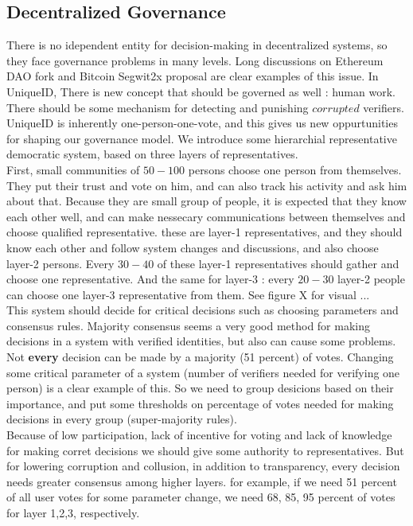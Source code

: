 \documentclass{article}
\begin{document}
\subsection{Decentralized Governance}
There is no idependent entity for decision-making in decentralized systems, so they face governance problems in many levels. Long discussions on Ethereum DAO fork and Bitcoin Segwit2x proposal are clear examples of this issue. In UniqueID, There is new concept that should be governed as well : human work. There should be some mechanism for detecting and punishing $corrupted$ verifiers.
\\
UniqueID is inherently one-person-one-vote, and this gives us new oppurtunities for shaping our governance model. We introduce some hierarchial representative democratic system, based on three layers of representatives. 
\\
First, small communities of $50-100$ persons choose one person from themselves. They put their trust and vote on him, and can also track his activity and ask him about that. Because they are small group of people, it is expected that they know each other well, and can make nessecary communications between themselves and choose qualified representative. these are layer-1 representatives, and they should know each other and follow system changes and discussions, and also choose layer-2 persons. Every $30-40$ of these layer-1 representatives should gather and choose one representative. And the same for layer-3 : every $20-30$ layer-2 people can choose one layer-3 representative from them. See figure X for visual ...
\\
This system should decide for critical decisions such as choosing parameters and consensus rules. Majority consensus seems a very good method for making decisions in a system with verified identities, but also can cause some problems. Not \textbf{every} decision can be made by a majority (51 percent) of votes. Changing some critical parameter of a system (number of verifiers needed for verifying one person) is a clear example of this. So we need to group desicions based on their importance, and put some thresholds on percentage of votes needed for making decisions in every group (super-majority rules).
\\
Because of low participation, lack of incentive for voting and lack of knowledge for making corret decisions we should give some authority to representatives. But for lowering corruption and collusion, in addition to transparency, every decision needs greater consensus among higher layers. for example, if we need 51 percent of all user votes for some parameter change, we need 68, 85, 95 percent  of votes for layer 1,2,3, respectively.
\\
\end{document}
